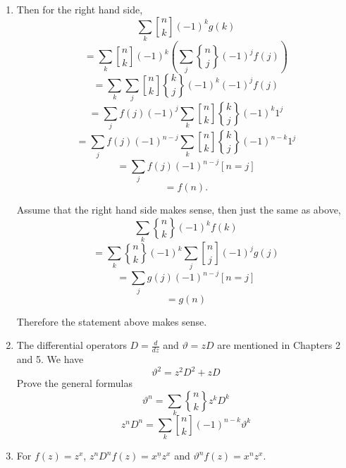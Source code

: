\documentclass[12pt,a4paper]{article}
\makeatletter
\newtheorem*{solution}{Solution}
\theoremstyle{definition}
\renewenvironment{solution}[1][Solution] {\par\pushQED{\qed}\normalfont\topsep6\p@\@plus6\p@\relax\trivlist\item[\hskip\labelsep\bfseries#1\@addpunct{.}]\ignorespaces}{\popQED\endtrivlist\@endpefalse} \makeatother
\makeatother
\begin{document}
\begin{enumerate}
\begin{solution}
        	Then for the right hand side,
        	\begin{equation*}
        	    \sum_k{n \brack k}(-1)^kg(k)
        	\end{equation*}
        	\begin{equation*}
        	    =\sum_k{n \brack k}(-1)^k (\sum_j{n \brace j} (-1)^j f(j))
        	\end{equation*}
        	\begin{equation*}
        	    =\sum_k\sum_j{ n \brack k}{k \brace j} (-1)^k (-1)^j f(j)
        	\end{equation*}
        	\begin{equation*}
        	    =\sum_j f(j) (-1)^j \sum_k {n \brack k}{k \brace j}(-1)^k 1^j
        	\end{equation*}
        	\begin{equation*}
        	    =\sum_j f(j) (-1)^{n-j} \sum_k {n \brack k}{k \brace j}(-1)^{n-k} 1^j
        	\end{equation*}
        	\begin{equation*}
        	    =\sum_j f(j) (-1)^{n-j} [n=j]
        	\end{equation*}
        	\begin{equation*}
        	    =f(n).
        	\end{equation*}
        	
        	Assume that the right hand side makes sense, then just the same as above,
        	\begin{equation*}
        	    \sum_k{n \brace k}(-1)^kf(k)
        	\end{equation*}
        	\begin{equation*}
        	    =\sum_k{n \brace k}(-1)^k \sum_j {n \brack j}(-1)^j g(j)
        	\end{equation*}
        	\begin{equation*}
        	    =\sum_j g(j)(-1)^{n-j}[n=j]
        	\end{equation*}
        	\begin{equation*}
        	    =g(n)
        	\end{equation*}
        	
        	Therefore the statement above makes sense.
        \end{solution}
    \item 
        The differential operators $D=\frac{d}{dz}$ and $\vartheta=zD$ are mentioned in Chapters 2 and 5. We have
        \begin{equation*}
            \vartheta^2=z^2D^2+zD
        \end{equation*}
        Prove the general formulas
        \begin{equation*}
            \vartheta^n=\sum_k {n\brace k} z^kD^k
        \end{equation*}
        \begin{equation*}
            z^nD^n=\sum_k{ n \brack k} (-1)^{n-k} \vartheta^k
        \end{equation*}
        \begin{solution}
        	For $f(z)=z^x$, $z^nD^nf(z)=x^{\underline{n}}z^{x}$ and $\vartheta^nf(z)=x^{n}z^x$.
        	

\end{solution}
\end{enumerate}
\end{document}
